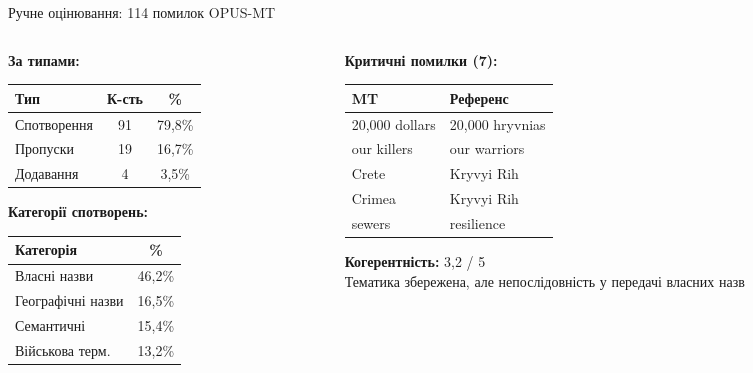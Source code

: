\documentclass[aspectratio=169]{beamer}
\begin{document}
\begin{frame}{Ручне оцінювання: 114 помилок OPUS-MT}
\begin{columns}[T]
\begin{column}{0.48\textwidth}
\textbf{За типами:}
\begin{tabular}{lcc}
\toprule
Тип & К-сть & \% \\
\midrule
Спотворення & 91 & 79,8\% \\
Пропуски & 19 & 16,7\% \\
Додавання & 4 & 3,5\% \\
\bottomrule
\end{tabular}

\vspace{0.5em}
\textbf{Категорії спотворень:}
\begin{tabular}{lc}
\toprule
Категорія & \% \\
\midrule
Власні назви & 46,2\% \\
Географічні назви & 16,5\% \\
Семантичні & 15,4\% \\
Військова терм. & 13,2\% \\
\bottomrule
\end{tabular}
\end{column}
\begin{column}{0.50\textwidth}
\textbf{Критичні помилки (7):}
\small
\begin{tabular}{ll}
\toprule
\textbf{MT} & \textbf{Референс} \\
\midrule
20,000 dollars & 20,000 hryvnias \\
our killers & our warriors \\
Crete & Kryvyi Rih \\
Crimea & Kryvyi Rih \\
sewers & resilience \\
\bottomrule
\end{tabular}

\vspace{0.5em}
\textbf{Когерентність:} 3,2 / 5\\
\small Тематика збережена, але непослідовність у передачі власних назв
\end{column}
\end{columns}
\end{frame}
\end{document}
